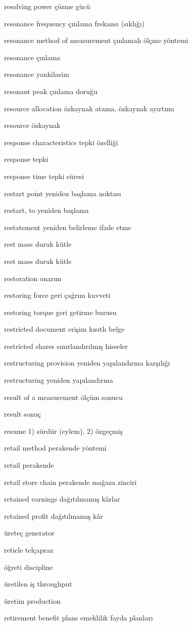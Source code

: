 \documentclass[12pt,fleqn]{article}\usepackage{../../common}
\begin{document}
resolving power çözme gücü

resonance frequency çınlama frekansı (sıklığı)

resonance method of measurement çınlamalı ölçme yöntemi

resonance çınlama

resonance yankilasim

resonant peak çınlama doruğu

resource allocation özkaynak atama, özkaynak ayırtımı

resource özkaynak

response characteristics tepki özelliği

response tepki

response time tepki süresi

restart point yeniden başlama noktası

restart, to yeniden başlama

restatement yeniden belirleme ifade etme

rest mass duruk kütle

rest mass duruk kütle

restoration onarım

restoring force geri çağrım kuvveti

restoring torque geri getirme burusu

restricted document erişim kısıtlı belge

restricted shares sınırlandırılmış hisseler

restructuring provision yeniden yapılandırma karşılığı

restructuring yeniden yapılandırma

result of a measurement ölçüm sonucu

result sonuç

resume 1) sürdür (eylem), 2) özgeçmiş

retail method perakende yöntemi

retail perakende

retail store chain perakende mağaza zinciri

retained earnings dağıtılmamış kârlar

retained profit dağıtılmamış kâr

üreteç generator

reticle telçapraz

öğreti discipline

üretilen iş throughput

üretim production

retirement benefit plans emeklilik fayda planları
\end{document}
